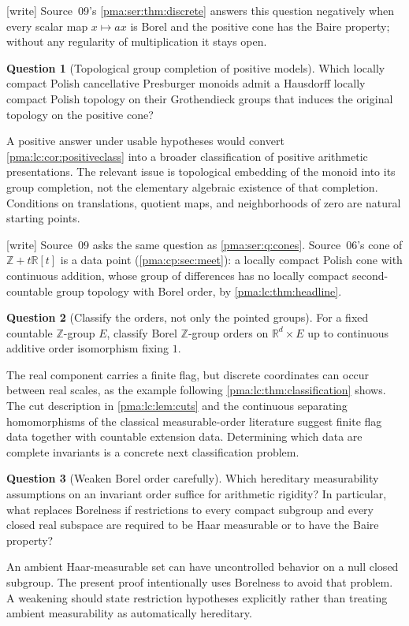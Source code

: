 \documentclass[11pt]{article}
\numberwithin{equation}{section}
\theoremstyle{definition}
\newtheorem{question}[question]{Question}
\theoremstyle{remark}
\newcommand{\Z}{\mathbb Z}
\newcommand{\R}{\mathbb R}
\newcommand{\writetag}{\textup{\textsf{\small[write]}}}
\begin{document}
\noindent\writetag{} Source~09's \cref{pma:ser:thm:discrete} answers this
question negatively when every scalar map $x\mapsto ax$ is Borel and the
positive cone has the Baire property; without any regularity of
multiplication it stays open.

\begin{question}[Topological group completion of positive models]\label{pma:lc:q:completion}
Which locally compact Polish cancellative Presburger monoids admit a
Hausdorff locally compact Polish topology on their Grothendieck groups
that induces the original topology on the positive cone?
\end{question}
A positive answer under usable hypotheses would convert
\cref{pma:lc:cor:positiveclass} into a broader classification of positive
arithmetic presentations. The relevant issue is topological embedding
of the monoid into its group completion, not the elementary algebraic
existence of that completion. Conditions on translations, quotient maps,
and neighborhoods of zero are natural starting points.

\noindent\writetag{} Source~09 asks the same question as
\cref{pma:ser:q:cones}. Source~06's cone of $\Z+t\R[t]$ is a data point
(\cref{pma:cp:sec:meet}): a locally compact Polish cone with continuous
addition, whose group of differences has no locally compact second-countable
group topology with Borel order, by \cref{pma:lc:thm:headline}.

\begin{question}[Classify the orders, not only the pointed groups]
For a fixed countable $\Z$-group $E$, classify Borel $\Z$-group orders
on $\R^d\times E$ up to continuous additive order isomorphism fixing $1$.
\end{question}
The real component carries a finite flag, but discrete coordinates can
occur between real scales, as the example following
\cref{pma:lc:thm:classification} shows. The cut description in
\cref{pma:lc:lem:cuts} and the continuous separating homomorphisms of the
classical measurable-order literature suggest finite flag data together
with countable extension data. Determining which data are complete
invariants is a concrete next classification problem.

\begin{question}[Weaken Borel order carefully]
Which hereditary measurability assumptions on an invariant order suffice
for arithmetic rigidity? In particular, what replaces Borelness if
restrictions to every compact subgroup and every closed real subspace
are required to be Haar measurable or to have the Baire property?
\end{question}
An ambient Haar-measurable set can have uncontrolled behavior on a
null closed subgroup. The present proof intentionally uses Borelness
to avoid that problem. A weakening should state restriction hypotheses
explicitly rather than treating ambient measurability as automatically
hereditary.
\end{document}
